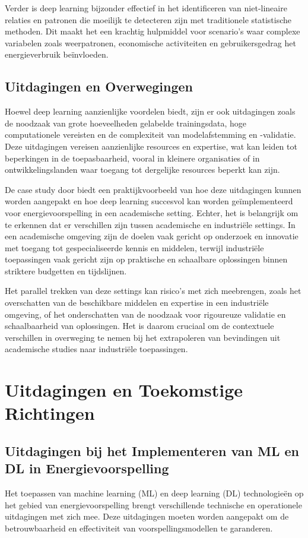 Verder is deep learning bijzonder effectief in het identificeren van niet-lineaire relaties en patronen die moeilijk te detecteren zijn met traditionele statistische methoden. Dit maakt het een krachtig hulpmiddel voor scenario's waar complexe variabelen zoals weerpatronen, economische activiteiten en gebruikersgedrag het energieverbruik beïnvloeden.

\subsection{Uitdagingen en Overwegingen}

Hoewel deep learning aanzienlijke voordelen biedt, zijn er ook uitdagingen zoals de noodzaak van grote hoeveelheden gelabelde trainingsdata, hoge computationele vereisten en de complexiteit van modelafstemming en -validatie. Deze uitdagingen vereisen aanzienlijke resources en expertise, wat kan leiden tot beperkingen in de toepasbaarheid, vooral in kleinere organisaties of in ontwikkelingslanden waar toegang tot dergelijke resources beperkt kan zijn.

De case study door \textcite{Alanbar_2020} biedt een praktijkvoorbeeld van hoe deze uitdagingen kunnen worden aangepakt en hoe deep learning succesvol kan worden geïmplementeerd voor energievoorspelling in een academische setting. Echter, het is belangrijk om te erkennen dat er verschillen zijn tussen academische en industriële settings. In een academische omgeving zijn de doelen vaak gericht op onderzoek en innovatie met toegang tot gespecialiseerde kennis en middelen, terwijl industriële toepassingen vaak gericht zijn op praktische en schaalbare oplossingen binnen striktere budgetten en tijdslijnen.

Het parallel trekken van deze settings kan risico’s met zich meebrengen, zoals het overschatten van de beschikbare middelen en expertise in een industriële omgeving, of het onderschatten van de noodzaak voor rigoureuze validatie en schaalbaarheid van oplossingen. Het is daarom cruciaal om de contextuele verschillen in overweging te nemen bij het extrapoleren van bevindingen uit academische studies naar industriële toepassingen.

\section{Uitdagingen en Toekomstige Richtingen}

\subsection{Uitdagingen bij het Implementeren van ML en DL in Energievoorspelling}
Het toepassen van machine learning (ML) en deep learning (DL) technologieën op het gebied van energievoorspelling brengt verschillende technische en operationele uitdagingen met zich mee. Deze uitdagingen moeten worden aangepakt om de betrouwbaarheid en effectiviteit van voorspellingsmodellen te garanderen.

